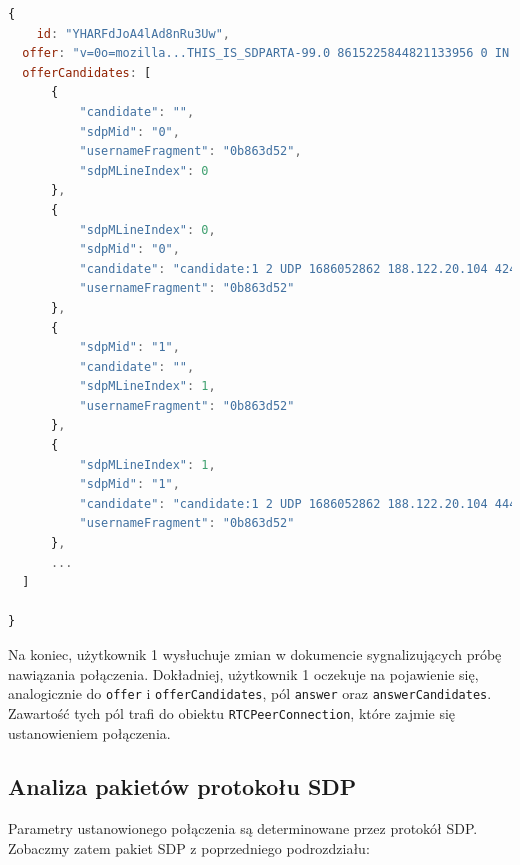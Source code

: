 \begin{lstlisting}[language=Javascript,label=list:call-doc-3, caption=Dokument połączenia po dodaniu kandydatów ICE,
basicstyle=\footnotesize \ttfamily, showtabs=true, tabsize=4]
{
	id: "YHARFdJoA4lAd8nRu3Uw",
  offer: "v=0o=mozilla...THIS_IS_SDPARTA-99.0 8615225844821133956 0 IN IP4 0.0.0.0s=-t=0 0a=fingerprint:sha-256 5F:A8:8A:A5:B8:1D:0C:39:21:93:FA:3A:B2:B7:B6:3F:EF:8A:5D:3C:6E:86:2E:A7:0A:D4:F0:E3:58:E0:E2:7B...",
  offerCandidates: [
      {
          "candidate": "",
          "sdpMid": "0",
          "usernameFragment": "0b863d52",
          "sdpMLineIndex": 0
      },
      {
          "sdpMLineIndex": 0,
          "sdpMid": "0",
          "candidate": "candidate:1 2 UDP 1686052862 188.122.20.104 42436 typ srflx raddr 192.168.1.2 rport 42436",
          "usernameFragment": "0b863d52"
      },
      {
          "sdpMid": "1",
          "candidate": "",
          "sdpMLineIndex": 1,
          "usernameFragment": "0b863d52"
      },
      {
          "sdpMLineIndex": 1,
          "sdpMid": "1",
          "candidate": "candidate:1 2 UDP 1686052862 188.122.20.104 44466 typ srflx raddr 192.168.1.2 rport 44466",
          "usernameFragment": "0b863d52"
      },
      ...
  ]

}
\end{lstlisting}

Na koniec, użytkownik 1 wysłuchuje zmian w dokumencie sygnalizujących próbę nawiązania połączenia. Dokładniej,
użytkownik 1 oczekuje na pojawienie się, analogicznie do \verb|offer| i \verb|offerCandidates|, pól \verb|answer| oraz
\verb|answerCandidates|. Zawartość tych pól trafi do obiektu \verb|RTCPeerConnection|, które zajmie się ustanowieniem
połączenia.


\subsection{Analiza pakietów protokołu SDP}

Parametry ustanowionego połączenia są determinowane przez protokół SDP. Zobaczmy zatem pakiet SDP z poprzedniego
podrozdziału:

